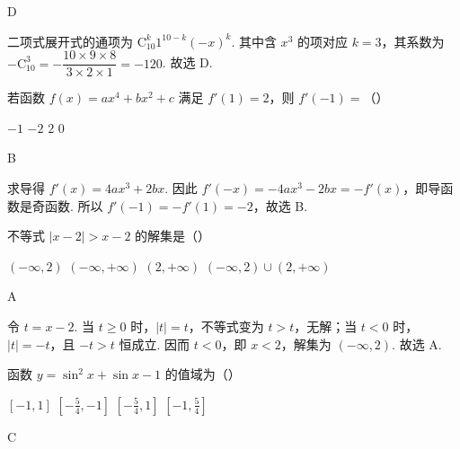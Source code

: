 \begin{answer}
D
\end{answer}

\begin{solution}
二项式展开式的通项为 \(\mathrm C_{10}^{k}1^{10-k}(-x)^{k}\). 其中含 \(x^{3}\) 的项对应 \(k=3\)，其系数为 \(-\mathrm C_{10}^{3}=-\dfrac{10\times9\times8}{3\times2\times1}=-120\). 故选 D.
\end{solution}

\begin{problem}
若函数 \(f(x) = ax^4 + bx^2 + c\) 满足 \(f'(1) = 2\)，则 \(f'(-1) =\)（\quad）

\choices
    {\(-1\)}
    {\(-2\)}
    {\(2\)}
    {\(0\)}
\end{problem}

\begin{answer}
B
\end{answer}

\begin{solution}
求导得 \(f'(x)=4ax^{3}+2bx\). 因此 \(f'(-x)=-4ax^{3}-2bx=-f'(x)\)，即导函数是奇函数. 所以 \(f'(-1)=-f'(1)=-2\)，故选 B.
\end{solution}

\begin{problem}
不等式 \(|x - 2| > x - 2\) 的解集是（\quad）

\choices
    {\((-\infty, 2)\)}
    {\((-\infty, +\infty)\)}
    {\((2, +\infty)\)}
    {\((-\infty, 2) \cup (2, +\infty)\)}
\end{problem}

\begin{answer}
A
\end{answer}

\begin{solution}
令 \(t=x-2\). 当 \(t\geqslant0\) 时，\(\lvert t\rvert=t\)，不等式变为 \(t>t\)，无解；当 \(t<0\) 时，\(\lvert t\rvert=-t\)，且 \(-t>t\) 恒成立. 因而 \(t<0\)，即 \(x<2\)，解集为 \((-\infty,2)\). 故选 A.
\end{solution}

\begin{problem}
函数 \(y = \sin^{2}x + \sin x - 1\) 的值域为（\quad）

\choices
    {\([-1, 1]\)}
    {\(\left[-\frac{5}{4}, -1\right]\)}
    {\(\left[-\frac{5}{4}, 1\right]\)}
    {\(\left[-1, \frac{5}{4}\right]\)}
\end{problem}

\begin{answer}
C
\end{answer}

